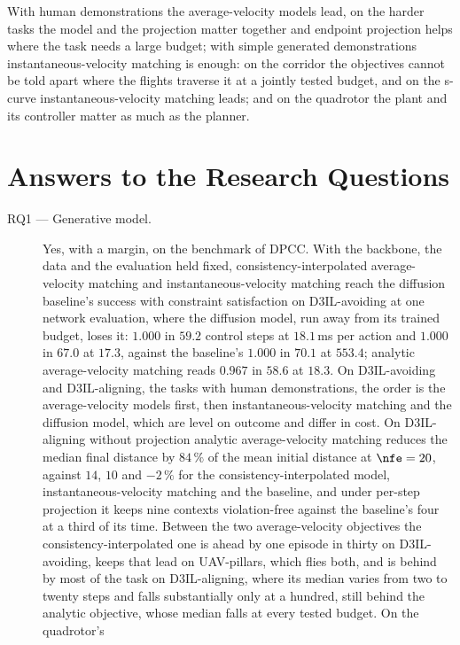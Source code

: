 With human demonstrations the average-velocity models lead, on the harder tasks the model and the
projection matter together and endpoint projection helps where the task needs a large budget; with
simple generated demonstrations instantaneous-velocity matching is enough: on the corridor the
objectives cannot be told apart where the flights traverse it at a jointly tested budget, and on the
s-curve instantaneous-velocity matching leads; and on the quadrotor the plant and its controller
matter as much as the planner.

\section{Answers to the Research Questions}\label{sec:conc:rqs}

\begin{description}
  \item[RQ1 --- Generative model.] Yes, with a margin, on the benchmark of \ac{DPCC}. With the
    backbone, the data and the evaluation held fixed, consistency-interpolated average-velocity
    matching and instantaneous-velocity matching reach the diffusion baseline's success with
    constraint satisfaction on D3IL-avoiding at one network evaluation, where the diffusion model,
    run away from its trained budget, loses it: $1.000$ in $59.2$ control steps at $18.1$\,ms per
    action and $1.000$ in $67.0$ at $17.3$, against the baseline's $1.000$ in $70.1$ at $553.4$;
    analytic average-velocity matching reads $0.967$ in $58.6$ at $18.3$. On D3IL-avoiding and
    D3IL-aligning, the tasks with human demonstrations, the order is the average-velocity models
    first, then instantaneous-velocity matching and the diffusion model, which are level on outcome
    and differ in cost. On D3IL-aligning without projection analytic average-velocity matching
    reduces the median final distance by $84\,\%$ of the mean initial distance at $\nfe = 20$,
    against $14$, $10$ and $-2\,\%$ for the consistency-interpolated model, instantaneous-velocity
    matching and the baseline, and under per-step projection it keeps nine contexts violation-free
    against the baseline's four at a third of its time. Between the two average-velocity objectives
    the consistency-interpolated one is ahead by one episode in thirty on D3IL-avoiding, keeps that
    lead on UAV-pillars, which flies both, and is behind by most of the task on D3IL-aligning, where
    its median varies from two to twenty steps and falls substantially only at a hundred, still
    behind the analytic objective, whose median falls at every tested budget. On the quadrotor's

\end{description}
